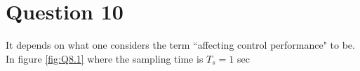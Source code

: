 \section{Question 10}

It depends on what one considers the term ``affecting control performance" to be.
In figure \ref{fig:Q8.1} where the sampling time is $T_s=1$ sec
